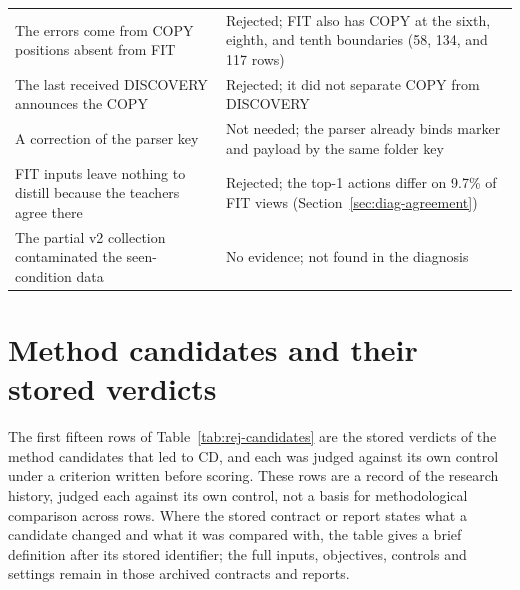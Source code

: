 \begin{table}[htbp]
\begin{tabularx}{\textwidth}{@{}>{\raggedright\arraybackslash}X>{\raggedright\arraybackslash}X@{}}
The errors come from COPY positions absent from FIT
  & Rejected; FIT also has COPY at the sixth, eighth, and tenth
    boundaries (58, 134, and 117 rows) \\
The last received DISCOVERY announces the COPY
  & Rejected; it did not separate COPY from DISCOVERY \\
A correction of the parser key
  & Not needed; the parser already binds marker and payload by the same
    folder key \\
FIT inputs leave nothing to distill because the teachers agree there
  & Rejected; the top-1 actions differ on 9.7\% of FIT views
    (Section~\ref{sec:diag-agreement}) \\
The partial v2 collection contaminated the seen-condition data
  & No evidence; not found in the diagnosis \\
\bottomrule
\end{tabularx}
\end{table}

\section{Method candidates and their stored verdicts}
\label{sec:rej-candidates}

The first fifteen rows of Table~\ref{tab:rej-candidates} are the
stored verdicts of the method candidates that led to CD, and each was
judged against its own control under a criterion written before
scoring. These rows are a record of the research history, judged each
against its own control, not a basis for methodological comparison
across rows. Where the stored contract or report states what a
candidate changed and what it was compared with, the table gives a
brief definition after its stored identifier; the full inputs,
objectives, controls and settings remain in those archived contracts
and reports.

